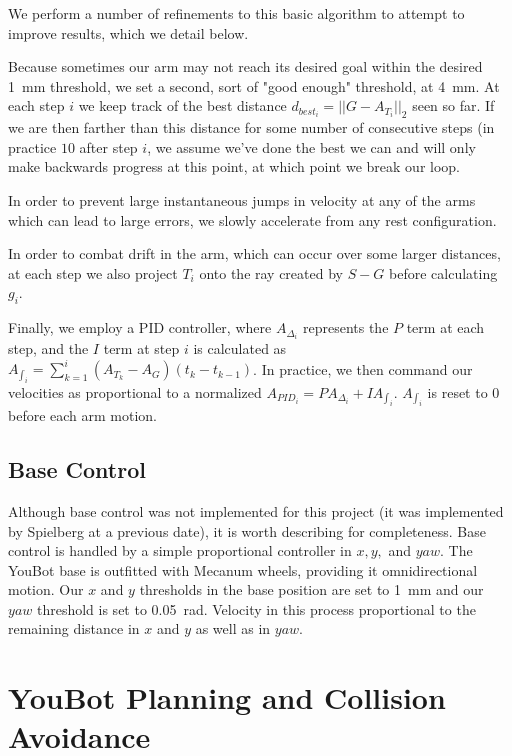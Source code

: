 \documentclass[conference]{acmsiggraph}
\begin{document}
We perform a number of refinements to this basic algorithm to attempt to improve results, which we detail below.

Because sometimes our arm may not reach its desired goal within the desired 1~mm threshold, we set a second, sort of "good enough" threshold, at 4~mm.  At each step $i$ we keep track of the best distance $d_{{best}_i} = ||G - A_{T_i}||_2$ seen so far.  If we are then farther than this distance for some number of consecutive steps (in practice $10$ after step $i$, we assume we've done the best we can and will only make backwards progress at this point, at which point we break our loop.

In order to prevent large instantaneous jumps in velocity at any of the arms which can lead to large errors, we slowly accelerate from any rest configuration.

In order to combat drift in the arm, which can occur over some larger distances, at each step we also project $T_{i}$ onto the ray created by $S - G$ before calculating $g_i$.

Finally, we employ a PID controller, where $A_{\Delta_i}$ represents the $P$ term at each step, and the $I$ term at step $i$ is calculated as $A_{\int_i} = \sum_{k=1}^{i} (A_{T_k} - A_G)(t_k - t_{k-1})$.  In practice, we then command our velocities as proportional to a normalized $A_{{PID}_i} = PA_{\Delta_i} + IA_{\int_i}$.  $A_{\int_i}$ is reset to $0$ before each arm motion.


\subsection{Base Control}
Although base control was not implemented for this project (it was implemented by Spielberg at a previous date), it is worth describing for completeness.  Base control is handled by a simple proportional controller in $x, y,$ and $yaw$.   The YouBot base is outfitted with Mecanum wheels, providing it omnidirectional motion.  Our $x$ and $y$ thresholds in the base position are set to 1~mm and our $yaw$ threshold is set to 0.05~rad.  Velocity in this process proportional to the remaining distance in $x$ and $y$ as well as in $yaw$.

\section{YouBot Planning and Collision Avoidance}
\end{document}
